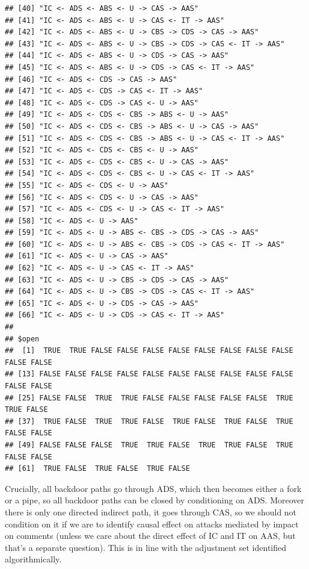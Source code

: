 \documentclass[
  10pt,
  dvipsnames,enabledeprecatedfontcommands]{scrartcl}
\begin{document}
\begin{verbatim}
## [40] "IC <- ADS <- ABS <- U -> CAS -> AAS"                    
## [41] "IC <- ADS <- ABS <- U -> CAS <- IT -> AAS"              
## [42] "IC <- ADS <- ABS <- U -> CBS -> CDS -> CAS -> AAS"      
## [43] "IC <- ADS <- ABS <- U -> CBS -> CDS -> CAS <- IT -> AAS"
## [44] "IC <- ADS <- ABS <- U -> CDS -> CAS -> AAS"             
## [45] "IC <- ADS <- ABS <- U -> CDS -> CAS <- IT -> AAS"       
## [46] "IC <- ADS <- CDS -> CAS -> AAS"                         
## [47] "IC <- ADS <- CDS -> CAS <- IT -> AAS"                   
## [48] "IC <- ADS <- CDS -> CAS <- U -> AAS"                    
## [49] "IC <- ADS <- CDS <- CBS -> ABS <- U -> AAS"             
## [50] "IC <- ADS <- CDS <- CBS -> ABS <- U -> CAS -> AAS"      
## [51] "IC <- ADS <- CDS <- CBS -> ABS <- U -> CAS <- IT -> AAS"
## [52] "IC <- ADS <- CDS <- CBS <- U -> AAS"                    
## [53] "IC <- ADS <- CDS <- CBS <- U -> CAS -> AAS"             
## [54] "IC <- ADS <- CDS <- CBS <- U -> CAS <- IT -> AAS"       
## [55] "IC <- ADS <- CDS <- U -> AAS"                           
## [56] "IC <- ADS <- CDS <- U -> CAS -> AAS"                    
## [57] "IC <- ADS <- CDS <- U -> CAS <- IT -> AAS"              
## [58] "IC <- ADS <- U -> AAS"                                  
## [59] "IC <- ADS <- U -> ABS <- CBS -> CDS -> CAS -> AAS"      
## [60] "IC <- ADS <- U -> ABS <- CBS -> CDS -> CAS <- IT -> AAS"
## [61] "IC <- ADS <- U -> CAS -> AAS"                           
## [62] "IC <- ADS <- U -> CAS <- IT -> AAS"                     
## [63] "IC <- ADS <- U -> CBS -> CDS -> CAS -> AAS"             
## [64] "IC <- ADS <- U -> CBS -> CDS -> CAS <- IT -> AAS"       
## [65] "IC <- ADS <- U -> CDS -> CAS -> AAS"                    
## [66] "IC <- ADS <- U -> CDS -> CAS <- IT -> AAS"              
## 
## $open
##  [1]  TRUE  TRUE FALSE FALSE FALSE FALSE FALSE FALSE FALSE FALSE FALSE FALSE
## [13] FALSE FALSE FALSE FALSE FALSE FALSE FALSE FALSE FALSE FALSE FALSE FALSE
## [25] FALSE FALSE  TRUE  TRUE FALSE FALSE FALSE FALSE FALSE  TRUE  TRUE FALSE
## [37]  TRUE FALSE  TRUE  TRUE FALSE  TRUE FALSE  TRUE FALSE  TRUE FALSE FALSE
## [49] FALSE FALSE FALSE  TRUE  TRUE FALSE  TRUE  TRUE FALSE  TRUE FALSE FALSE
## [61]  TRUE FALSE  TRUE FALSE  TRUE FALSE
\end{verbatim}

\normalsize

Crucially, all backdoor paths go through \textsf{ADS}, which then
becomes either a fork or a pipe, so all backdoor paths can be closed by
conditioning on \textsf{ADS}. Moreover there is only one directed
indirect path, it goes through \textsf{CAS}, so we should not condition
on it if we are to identify causal effect on attacks mediated by impact
on comments (unless we care about the direct effect of \textsf{IC} and
\textsf{IT} on \textsf{AAS}, but that's a separate question). This is in
line with the adjustment set identified algorithmically.
\end{document}
